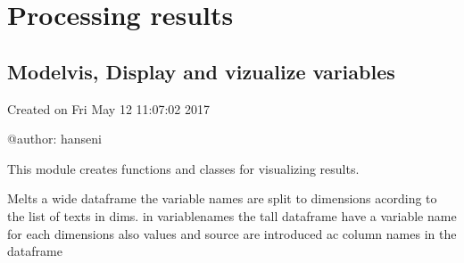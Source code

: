 \documentclass[letterpaper,10pt,english]{sphinxmanual}
\begin{document}
\chapter{Processing results}
\label{\detokenize{index:processing-results}}

\section{Modelvis, Display and vizualize variables}
\label{\detokenize{index:module-modelvis}}\label{\detokenize{index:modelvis-display-and-vizualize-variables}}
\sphinxAtStartPar
Created on Fri May 12 11:07:02 2017

\sphinxAtStartPar
@author: hanseni

\sphinxAtStartPar
This module creates functions and classes for visualizing results.

\begin{fulllineitems}
\label{\detokenize{index:modelvis.meltdim}}
\pysigstartsignatures
{}
\pysigstopsignatures
\sphinxAtStartPar
Melts a wide dataframe the variable names are split to dimensions acording
to the list of texts in dims. in variablenames
the tall dataframe have a variable name for each dimensions
also values and source are introduced ac column names in the dataframe

\end{fulllineitems}

\end{document}

